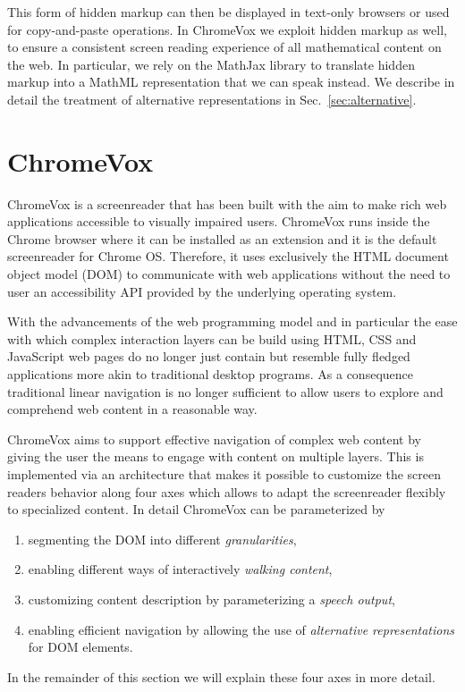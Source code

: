 \documentclass{sig-alternate}
\begin{document}
This form of hidden markup can then be displayed in
text-only browsers or used for copy-and-paste operations. 
In ChromeVox we exploit hidden markup as well, to ensure a consistent
screen reading experience of all mathematical content on the web.  In particular,
we rely on the MathJax library to translate hidden markup into a MathML
representation that we can speak instead. We describe in detail the treatment of
alternative representations in Sec.~\ref{sec:alternative}.




\section{ChromeVox}
\label{sec:chromevox}

ChromeVox is a screenreader that has been built with the aim to make rich web
applications accessible to visually impaired users. ChromeVox runs inside the
Chrome browser where it can be installed as an extension and it is the default
screenreader for Chrome OS. Therefore, it uses exclusively the HTML document
object model (DOM) to communicate with web applications without the need to user
an accessibility API provided by the underlying operating system.

With the advancements of the web programming model and in particular the ease
with which complex interaction layers can be build using HTML, CSS and
JavaScript web pages do no longer just contain but resemble fully fledged
applications more akin to traditional desktop programs. As a consequence
traditional linear navigation is no longer sufficient to allow users to explore
and comprehend web content in a reasonable way.

ChromeVox aims to support effective navigation of complex web content by giving
the user the means to engage with content on multiple layers. This is
implemented via an architecture that makes it possible to customize the screen
readers behavior along four axes which allows to adapt the screenreader
flexibly to specialized content. In detail ChromeVox can be parameterized by 
\begin{enumerate}[(1)]
\item segmenting the DOM into different \emph{granularities},
\item enabling different ways of interactively \emph{walking content},
\item customizing content description by parameterizing a \emph{speech output},
\item enabling efficient navigation by allowing the use of \emph{alternative
    representations} for DOM elements.
\end{enumerate}
In the remainder of this section we will explain these four axes in more detail.
\end{document}
